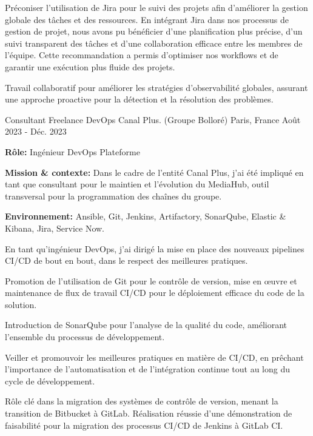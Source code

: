 \begin{cventries}
{\begin{cvitems}
    \item {Préconiser l'utilisation de Jira pour le suivi des projets afin d'améliorer la gestion globale des tâches et des ressources. En intégrant Jira dans nos processus de gestion de projet, nous avons pu bénéficier d'une planification plus précise, d'un suivi transparent des tâches et d'une collaboration efficace entre les membres de l'équipe. Cette recommandation a permis d'optimiser nos workflows et de garantir une exécution plus fluide des projets.}
    \item {Travail collaboratif pour améliorer les stratégies d'observabilité globales, assurant une approche proactive pour la détection et la résolution des problèmes.}
  \end{cvitems}
}

\cventry
{Consultant Freelance DevOps} %
{Canal Plus. (Groupe Bolloré)} %
{Paris, France} %
{Août 2023 - Déc. 2023} %
{
  \begin{cvitems} %
    \item {\textbf{Rôle:} Ingénieur DevOps Plateforme}
    \item {\textbf{Mission \& contexte:} Dans le cadre de l'entité Canal Plus, j'ai été impliqué en tant que consultant pour le maintien et l'évolution du MediaHub, outil transversal pour la programmation des chaînes du groupe.}
    \item {\textbf{Environnement:} Ansible, Git, Jenkins, Artifactory, SonarQube, Elastic \& Kibana, Jira, Service Now.}
    \item {En tant qu'ingénieur DevOps, j'ai dirigé la mise en place des nouveaux pipelines CI/CD de bout en bout, dans le respect des meilleures pratiques.}
    \item {Promotion de l'utilisation de Git pour le contrôle de version, mise en œuvre et maintenance de flux de travail CI/CD pour le déploiement efficace du code de la solution.}
    \item {Introduction de SonarQube pour l'analyse de la qualité du code, améliorant l'ensemble du processus de développement.}
    \item {Veiller et promouvoir les meilleures pratiques en matière de CI/CD, en prêchant l'importance de l'automatisation et de l'intégration continue tout au long du cycle de développement.}
    \item {Rôle clé dans la migration des systèmes de contrôle de version, menant la transition de Bitbucket à GitLab. Réalisation réussie d'une démonstration de faisabilité pour la migration des processus CI/CD de Jenkins à GitLab CI.}

\end{cvitems}}
\end{cventries}

